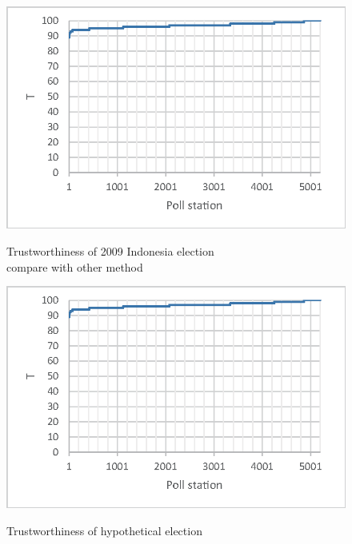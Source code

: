 \documentclass[JIP]{ipsj}
\begin{document}
\begin{figure}[tb]%
\vbox{\it
  \hbox{\includegraphics[scale=0.8]{images/Trustworthiness3.eps}}}
\centerline{}
\caption{Trustworthiness of 2009 Indonesia election\\
compare with other method}
\label{fig:result2}
\end{figure}

\begin{figure}[tb]%
\vbox{\it
  \hbox{\includegraphics[scale=0.8]{images/Trustworthiness3.eps}}}
\centerline{}
\caption{Trustworthiness of hypothetical election}
\label{fig:result3}
\end{figure}
\end{document}
